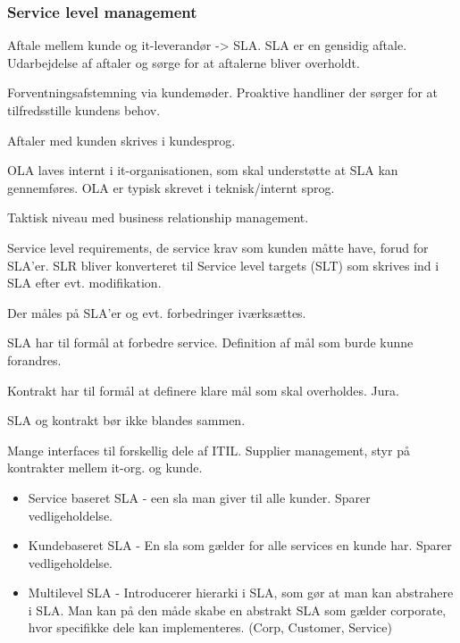 \subsubsection{Service level management}
Aftale mellem kunde og it-leverandør -> SLA. SLA er en gensidig aftale. Udarbejdelse af aftaler og sørge for at aftalerne bliver overholdt. 

Forventningsafstemning via kundemøder. Proaktive handliner der sørger for at tilfredsstille kundens behov.

Aftaler med kunden skrives i kundesprog.

OLA laves internt i it-organisationen, som skal understøtte at SLA kan gennemføres. OLA er typisk skrevet i teknisk/internt sprog.

Taktisk niveau med business relationship management.

Service level requirements, de service krav som kunden måtte have, forud for SLA'er. SLR bliver konverteret til Service level targets (SLT) som skrives ind i SLA efter evt. modifikation.

Der måles på SLA'er og evt. forbedringer iværksættes.

SLA har til formål at forbedre service. Definition af mål som burde kunne forandres.

Kontrakt har til formål at definere klare mål som skal overholdes. Jura.

SLA og kontrakt bør ikke blandes sammen.

Mange interfaces til forskellig dele af ITIL. Supplier management, styr på kontrakter mellem it-org. og kunde.

\begin{itemize}
\item Service baseret SLA - een sla man giver til alle kunder. Sparer vedligeholdelse.
\item Kundebaseret SLA - En sla som gælder for alle services en kunde har. Sparer vedligeholdelse.
\item Multilevel SLA - Introducerer hierarki i SLA, som gør at man kan abstrahere i SLA. Man kan på den måde skabe en abstrakt SLA som gælder corporate, hvor specifikke dele kan implementeres. (Corp, Customer, Service)
\end{itemize}

\subsubsection{}
























